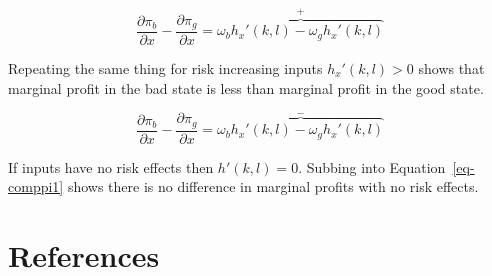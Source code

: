 \documentclass[
  letterpaper,
  DIV=11,
  numbers=noendperiod]{scrartcl}
\theoremstyle{plain}
\theoremstyle{plain}
\theoremstyle{remark}
\begin{document}
\[
\frac{\partial \pi_b}{\partial x}-\frac{\partial \pi_g}{\partial x}=\overbrace{\omega_bh_x'(k,l)-\omega_gh_x'(k,l)}^{+}
\]

Repeating the same thing for risk increasing inputs \(h_x'(k,l)>0\)
shows that marginal profit in the bad state is less than marginal profit
in the good state.

\[
\frac{\partial \pi_b}{\partial x}-\frac{\partial \pi_g}{\partial x}=\overbrace{\omega_bh_x'(k,l)-\omega_gh_x'(k,l)}^{-}
\]

If inputs have no risk effects then \(h'(k,l)=0\). Subbing into
Equation~\ref{eq-comppi1} shows there is no difference in marginal
profits with no risk effects.

\hypertarget{references}{%
\section*{References}\label{references}}
\end{document}
